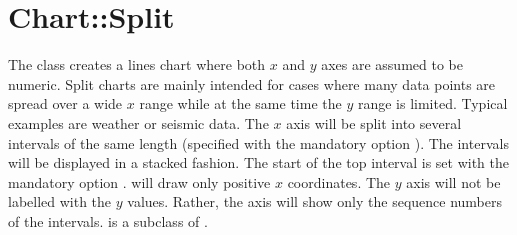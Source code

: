 %
%
\renewcommand{\thisname}{Chart::Split}
\section{\thisname}
\name{\thisname}
\begin{Description}
The class \thisclass creates a lines chart where both $x$ and $y$ axes
are assumed to be numeric. Split charts are mainly intended for cases
where many data points are spread over a wide $x$ range while at the
same time the $y$ range is limited. Typical examples are weather or
seismic data. The $x$ axis will be split into several intervals of the
same length (specified with the mandatory option ).
The intervals will be displayed in a stacked fashion. The start of the
top interval is set with the mandatory option .
\thisclass will draw only positive $x$ coordinates. The $y$ axis will
not be labelled with the $y$ values. Rather, the axis will show only
the sequence numbers of the intervals. \thisclass is a subclass of
.
\end{Description}

\example

